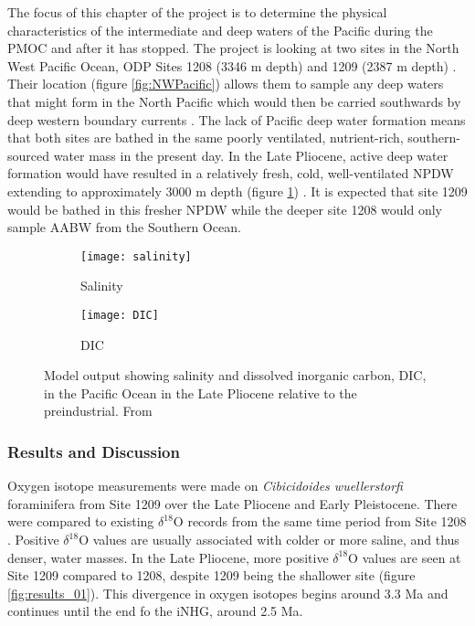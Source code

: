 The focus of this chapter of the project is to determine the physical characteristics of the intermediate and deep waters of the Pacific during the PMOC and after it has stopped. The project is looking at two sites in the North West Pacific Ocean, ODP Sites 1208 (3346 m depth) and 1209 (2387 m depth) \citep{bralowerLeg198Summary2002}. Their location (figure \ref{fig:NWPacific}) allows them to sample any deep waters that might form in the North Pacific which would then be carried southwards by deep western boundary currents \citep{fontelaNorthAtlanticWestern2020}. The lack of Pacific deep water formation means that both sites are bathed in the same poorly ventilated, nutrient-rich, southern-sourced water mass in the present day. In the Late Pliocene, active deep water formation would have resulted in a relatively fresh, cold, well-ventilated NPDW extending to approximately 3000 m depth (figure \ref{fig:DIC}) \citep{burlsActivePacificMeridional2017}. It is expected that site 1209 would be bathed in this fresher NPDW while the deeper site 1208 would only sample AABW from the Southern Ocean.

\newpage

\begin{figure}[h]
	\centering
	 \begin{subfigure}[b]{0.8\textwidth}
         	\centering
         	\texttt{[image: salinity]}
         	\caption{Salinity}
     	\end{subfigure}
	\begin{subfigure}[b]{0.8\textwidth}
         	\centering
         	\texttt{[image: DIC]}
         	\caption{DIC}
     	\end{subfigure}
   	 \caption{Model output showing salinity and dissolved inorganic carbon, DIC, in the Pacific Ocean in the Late Pliocene relative to the preindustrial. From \citet{fordSustainedMidPlioceneWarmth2022}}
    	\label{fig:DIC}
\end{figure}

\newpage

\subsubsection{Results and Discussion}

Oxygen isotope measurements were made on \emph{Cibicidoides wuellerstorfi} foraminifera from Site 1209 over the Late Pliocene and Early Pleistocene. There were compared to existing $\delta^{18}\text{O}$ records from the same time period from Site 1208 \citep{ventiPaleoproductivityNorthwesternPacific2017}. Positive $\delta^{18}\text{O}$ values are usually associated with colder or more saline, and thus denser, water masses. In the Late Pliocene, more positive $\delta^{18}\text{O}$ values are seen at Site 1209 compared to 1208, despite 1209 being the shallower site (figure \ref{fig:results_01}). This divergence in oxygen isotopes begins around 3.3 Ma and continues until the end fo the iNHG, around 2.5 Ma.

